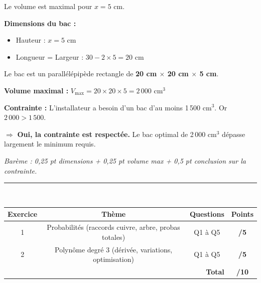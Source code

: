 \documentclass[a4paper,11pt]{article}
\begin{document}
\begin{corrbox}
Le volume est maximal pour $\boxed{x = 5 \text{ cm}}$.

\textbf{Dimensions du bac :}
\begin{itemize}[nosep]
  \item Hauteur : $x = 5$ cm
  \item Longueur = Largeur : $30 - 2 \times 5 = 20$ cm
\end{itemize}

Le bac est un parallélépipède rectangle de \textbf{20 cm $\times$ 20 cm $\times$ 5 cm}.

\textbf{Volume maximal :} $V_{\max} = 20 \times 20 \times 5 = \boxed{2\,000 \text{ cm}^3}$

\textbf{Contrainte :} L'installateur a besoin d'un bac d'au moins 1\,500 cm$^3$. Or $2\,000 > 1\,500$.

$\Rightarrow$ \textbf{Oui, la contrainte est respectée.} Le bac optimal de 2\,000 cm$^3$ dépasse largement le minimum requis.

\smallskip
\textit{Barème : 0,25 pt dimensions + 0,25 pt volume max + 0,5 pt conclusion sur la contrainte.}
\end{corrbox}

\vfill

\begin{center}
\textcolor{rouge}{\rule{12cm}{1pt}}\\[8pt]
\begin{tabular}{|c|c|c|c|}
\hline
\textbf{Exercice} & \textbf{Thème} & \textbf{Questions} & \textbf{Points} \\
\hline
1 & Probabilités (raccords cuivre, arbre, probas totales) & Q1 à Q5 & \textbf{/5} \\
\hline
2 & Polynôme degré 3 (dérivée, variations, optimisation) & Q1 à Q5 & \textbf{/5} \\
\hline
\multicolumn{3}{|r|}{\textbf{Total}} & \textbf{/10} \\
\hline
\end{tabular}
\end{center}
\end{document}
